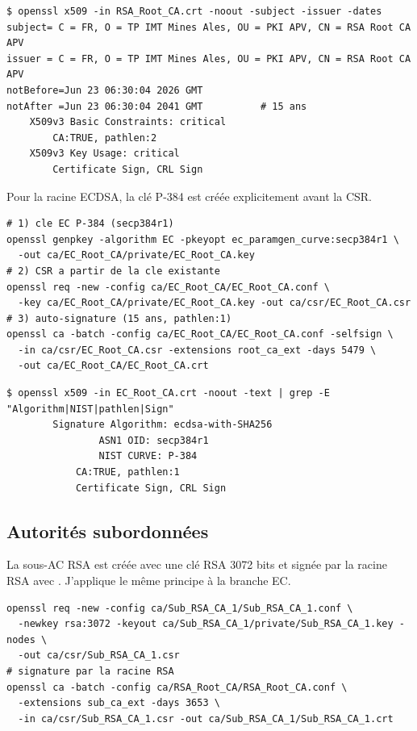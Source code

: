 \documentclass[11pt,a4paper]{article}
\newcommand{\file}[1]{\texttt{\detokenize{#1}}}
\begin{document}
\begin{lstlisting}[style=result]
$ openssl x509 -in RSA_Root_CA.crt -noout -subject -issuer -dates
subject= C = FR, O = TP IMT Mines Ales, OU = PKI APV, CN = RSA Root CA APV
issuer = C = FR, O = TP IMT Mines Ales, OU = PKI APV, CN = RSA Root CA APV
notBefore=Jun 23 06:30:04 2026 GMT
notAfter =Jun 23 06:30:04 2041 GMT          # 15 ans
    X509v3 Basic Constraints: critical
        CA:TRUE, pathlen:2
    X509v3 Key Usage: critical
        Certificate Sign, CRL Sign
\end{lstlisting}

Pour la racine ECDSA, la clé P-384 est créée explicitement avant la CSR.

\begin{lstlisting}[style=shellcmd]
# 1) cle EC P-384 (secp384r1)
openssl genpkey -algorithm EC -pkeyopt ec_paramgen_curve:secp384r1 \
  -out ca/EC_Root_CA/private/EC_Root_CA.key
# 2) CSR a partir de la cle existante
openssl req -new -config ca/EC_Root_CA/EC_Root_CA.conf \
  -key ca/EC_Root_CA/private/EC_Root_CA.key -out ca/csr/EC_Root_CA.csr
# 3) auto-signature (15 ans, pathlen:1)
openssl ca -batch -config ca/EC_Root_CA/EC_Root_CA.conf -selfsign \
  -in ca/csr/EC_Root_CA.csr -extensions root_ca_ext -days 5479 \
  -out ca/EC_Root_CA/EC_Root_CA.crt
\end{lstlisting}

\begin{lstlisting}[style=result]
$ openssl x509 -in EC_Root_CA.crt -noout -text | grep -E "Algorithm|NIST|pathlen|Sign"
        Signature Algorithm: ecdsa-with-SHA256
                ASN1 OID: secp384r1
                NIST CURVE: P-384
            CA:TRUE, pathlen:1
            Certificate Sign, CRL Sign
\end{lstlisting}

\subsection{Autorités subordonnées}
La sous-AC RSA est créée avec une clé RSA 3072 bits et signée par la racine RSA avec \file{sub_ca_ext}. J'applique le même principe à la branche EC.

\begin{lstlisting}[style=shellcmd]
openssl req -new -config ca/Sub_RSA_CA_1/Sub_RSA_CA_1.conf \
  -newkey rsa:3072 -keyout ca/Sub_RSA_CA_1/private/Sub_RSA_CA_1.key -nodes \
  -out ca/csr/Sub_RSA_CA_1.csr
# signature par la racine RSA
openssl ca -batch -config ca/RSA_Root_CA/RSA_Root_CA.conf \
  -extensions sub_ca_ext -days 3653 \
  -in ca/csr/Sub_RSA_CA_1.csr -out ca/Sub_RSA_CA_1/Sub_RSA_CA_1.crt
\end{lstlisting}
\end{document}
